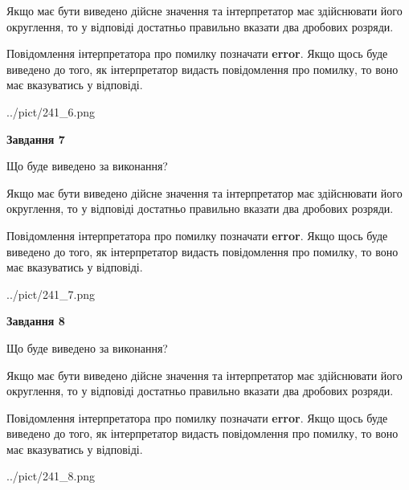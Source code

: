 \documentclass[12pt, ukrainian]{article}
\begin{document}
{\begin {Large}
Якщо має бути виведено дійсне значення та інтерпретатор має здійснювати його округлення, 
то у відповіді достатньо правильно вказати два дробових розряди.

Повідомлення інтерпретатора про помилку позначати \textbf{error}.
Якщо щось буде виведено до того, як інтерпретатор видасть повідомлення про помилку, 
то воно має вказуватись у відповіді. \par

\begin{center}
	{../pict/241_6.png}
\end{center}
\newpage

{\begin {center}\textbf{Завдання 7}\end {center}}\par
Що буде виведено за виконання? \par

Якщо має бути виведено дійсне значення та інтерпретатор має здійснювати його округлення, 
то у відповіді достатньо правильно вказати два дробових розряди.

Повідомлення інтерпретатора про помилку позначати \textbf{error}.
Якщо щось буде виведено до того, як інтерпретатор видасть повідомлення про помилку, 
то воно має вказуватись у відповіді. \par

\begin{center}
	{../pict/241_7.png}
\end{center}
\newpage

{\begin {center}\textbf{Завдання 8}\end {center}}\par
Що буде виведено за виконання? \par

Якщо має бути виведено дійсне значення та інтерпретатор має здійснювати його округлення, 
то у відповіді достатньо правильно вказати два дробових розряди.

Повідомлення інтерпретатора про помилку позначати \textbf{error}.
Якщо щось буде виведено до того, як інтерпретатор видасть повідомлення про помилку, 
то воно має вказуватись у відповіді. \par

\begin{center}
	{../pict/241_8.png}
\end{center}
\newpage


\end{Large}}
\end{document}
